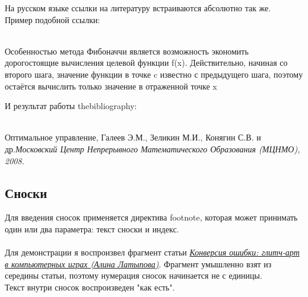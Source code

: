 \documentclass[a4paper]{article}
\newcommand{\cbox}[2][green]{%
  \colorbox{#1}{\parbox{\dimexpr\linewidth-2\fboxsep}{\strut #2\strut}}%
}
\begin{document}
На русском языке ссылки на литературу встраиваются абсолютно так же.\\
Пример подобной ссылки:\\\\
\cbox[lightgray!90]{Особенностью метода Фибоначчи является возможность экономить
дорогостоящие вычисления целевой функции f(x). Действительно, начиная со
второго шага, значение функции в точке c известно с предыдущего шага, поэтому
остаётся вычислить только значение в отраженной точке x\cite{Opt}}
\hfill\break
И результат работы thebibliography:\\\\
\cbox[lightgray!90]{
\begin{thebibliography}{5}
Оптимальное управление, Галеев Э.М., Зеликин М.И., Конягин С.В. и др.\emph{Московский Центр Непрерывного Математического Образования
 (МЦНМО), 2008.}
 \end{thebibliography}
}
\thispagestyle{empty}
\newpage
\subsection{Сноски}
Для введения сносок применяется директива footnote, которая может принимать один или два параметра: текст сноски и индекс.\\\\
Для демонстрации я воспроизвел фрагмент статьи \emph{\href{https://artguide.com/posts/1251}{Конверсия ошибки: глитч-арт в компьютерных играх (Алина Латыпова)}}. Фрагмент умышленно взят из середины статьи, поэтому нумерация сносок начинается не с единицы. \\Текст внутри сносок воспроизведен "как есть".\\
\end{document}

